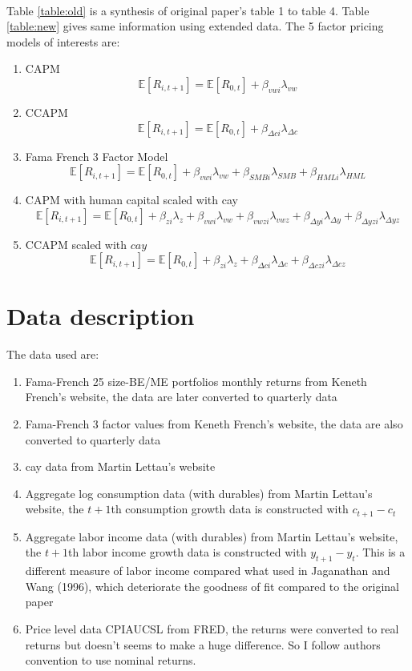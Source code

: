 \documentclass[12pt]{article}
\newcommand{\E}{\mathbb{E}}
\begin{document}
\quad \\
Table \ref{table:old} is a synthesis of original paper's table 1 to table 4.  Table \ref{table:new} gives same information using extended data. The 5 factor pricing models of interests are:
\begin{enumerate}
 \item CAPM
 $$\E[R_{i,t+1}] = \E[R_{0,t}] + \beta_{vwi} {\lambda}_{vw}$$
 \item CCAPM 
  $$\E[R_{i,t+1}] = \E[R_{0,t}] + \beta_{\Delta c i} {\lambda}_{\Delta c}$$
 \item Fama French 3 Factor Model 
  $$\E[R_{i,t+1}] = \E[R_{0,t}] + \beta_{vw i} {\lambda}_{vw} + \beta_{SMB i} {\lambda}_{SMB} + \beta_{HML i} {\lambda}_{HML}$$ 
 \item CAPM with human capital scaled with cay 
 $$\E[R_{i,t+1}] = \E[R_{0,t}] + \beta_{z i} {\lambda}_{z} +  \beta_{vw i} {\lambda}_{vw} + \beta_{vwz i} {\lambda}_{vwz} + \beta_{\Delta y i} {\lambda}_{\Delta y} + \beta_{\Delta yz i} {\lambda}_{\Delta y z}  $$ 
 \item CCAPM scaled with $cay$
 $$\E[R_{i,t+1}] = \E[R_{0,t}] + \beta_{z i} {\lambda}_{z} + \beta_{\Delta c i} {\lambda}_{\Delta c} + \beta_{\Delta c z i} {\lambda}_{\Delta cz }$$
\end{enumerate}

\section{Data description}
The data used are:
\begin{enumerate}
 \item Fama-French 25 size-BE/ME portfolios monthly returns from Keneth French's website, the data are later converted to quarterly data
\item Fama-French 3 factor values from Keneth French's website, the data are also converted to quarterly data
\item cay data from Martin Lettau's website 
\item Aggregate log consumption data (with durables) from Martin Lettau's website, the $t+1$th consumption growth data is constructed with $c_{t+1} - c_{t}$
\item Aggregate labor income data (with durables) from Martin Lettau's website, the $t+1$th labor income growth data is constructed with $y_{t+1} - y_{t}$. This is a different measure of labor income compared what used in Jaganathan and Wang (1996), which deteriorate the goodness of fit  compared to the original paper 
\item Price level data CPIAUCSL from FRED, the returns were converted to real returns but doesn't seems to make a huge difference. So I follow authors convention to use nominal returns.
\end{enumerate}
\end{document}
